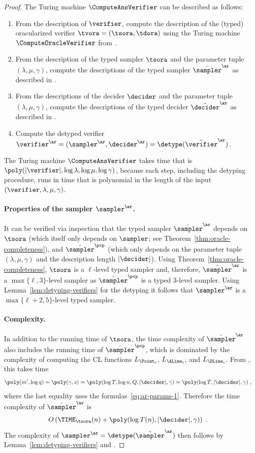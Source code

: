 \begin{proof}
The Turing machine $\ComputeAnsVerifier$ can be described as follows: 
\begin{enumerate}
\item From the description of $\verifier$, compute the description of the
  (typed) oracularized verifier $\tvora = (\tsora,\tdora)$ using the Turing
  machine $\ComputeOracleVerifier$ from .
\item From the description of the typed sampler $\tsora$ and the parameter tuple
  $(\lambda,\mu,\gamma)$, compute the descriptions of the typed sampler $\tsans$
  as described in .
\item From the descriptions of the decider $\decider$ and the parameter tuple
  $(\lambda,\mu,\gamma)$, compute the descriptions of the typed decider $\tdans$
  as described in .
\item Compute the detyped verifier $\verifier^\ar = (\sampler^\ar,\decider^\ar)
  = \detype(\tvans)$.
\end{enumerate}
The Turing machine $\ComputeAnsVerifier$ takes time that is
$\poly(|\verifier|,\log \lambda,\log \mu,\log \gamma)$, because each step,
including the detyping procedure, runs in time that is polynomial in the length
of the input $(\verifier,\lambda,\mu,\gamma)$.

\paragraph{Properties of the sampler $\sans$.}
It can be verified via inspection that the typed sampler $\tsans$ depends on
$\tsora$ (which itself only depends on $\sampler$; see
Theorem~\ref{thm:oracle-completeness}), and $\tspcp$ (which only depends on the
parameter tuple $(\lambda,\mu,\gamma)$ and the description length $|\decider|$).
Using Theorem~\ref{thm:oracle-completeness}, $\tsora$ is a $\ell$-level typed
sampler and, therefore, $\tsans$ is a $\max\{\ell, 3\}$-level sampler as
$\tspcp$ is a typed $3$-level sampler.
Using Lemma~\ref{lem:detyping-verifiers} for the detyping it follows that
$\sans$ is a $\max\{\ell+2, 5\}$-level typed sampler.
  
\paragraph{Complexity.}
In addition to the running time of $\tsora$, the time complexity of $\tsans$
also includes the running time of $\tspcp$, which is dominated by the complexity
of computing the CL functions $L_{\Point_i}$, $L_{\ALine_i}$, and $L_{\DLine_i}$.
From , this takes time 
\[ \poly(m', \log q) =
\poly(\gamma,s) = \poly(\log T, \log n, Q, |\decider| ,\gamma) = \poly(\log
T,|\decider|,\gamma)\;,\]
where the last equality uses the formulas~\eqref{eq:ar-params-1}. Therefore the time complexity of $\tsans$ is
\[
	O \left ( \TIME_{\tsora}(n) + \poly(\log T(n),|\decider|,\gamma) \right)\;.
\] 
The complexity of $\sans = \detype(\tsans)$ then follows by
Lemma~\ref{lem:detyping-verifiers} and .




\end{proof}

